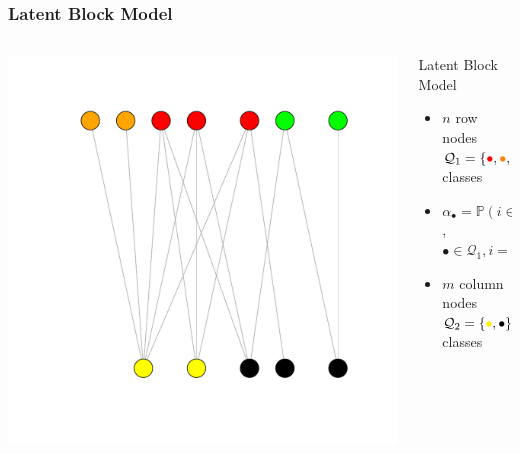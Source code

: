 \documentclass[nopagenumber,9pt]{beamer}
\begin{document}
\begin{frame}
\frametitle{Latent Block Model}

 \begin{center}
    \begin{overlayarea}{\textwidth}{.5\textheight}
      \begin{columns}
        \begin{column}{.45\paperwidth}
        \centering
        \includegraphics[scale=.3]{plots/LBM_exemple.pdf}
        \end{column}
        \begin{column}{.5\paperwidth}
          \begin{small}
            \begin{block}{Latent Block Model}
              \begin{itemize}
              \item
                $n$ row nodes $\mathcal{Q}_1=\{\textcolor{red}{\bullet},\textcolor{orange}{\bullet},\textcolor{green}{\bullet}\}$
                classes
              \item  $\alpha_\bullet  =  \mathbb{P}(i  \in  \bullet)$,
                $\bullet\in\mathcal{Q}_1,i=1,\dots,n$
              \item $m$ column nodes $\mathcal{Q}_2=\{\textcolor{yellow}{\bullet},\textcolor{black}{\bullet}\}$
                classes

\end{itemize}
\end{block}
\end{small}
\end{column}
\end{columns}
\end{overlayarea}
\end{center}
\end{frame}
\end{document}

